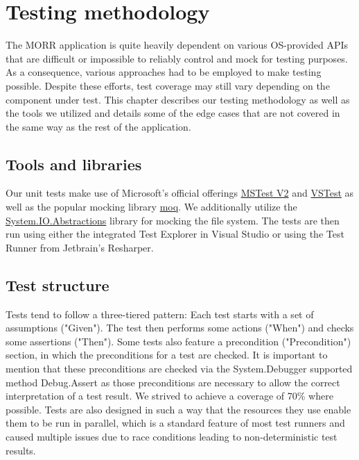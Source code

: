 \chapter{Testing methodology}

The MORR application is quite heavily dependent on various OS-provided APIs that are difficult or impossible to reliably control and mock for testing purposes. As a consequence, various approaches had to be employed to make testing possible. Despite these efforts, test coverage may still vary depending on the component under test. This chapter describes our testing methodology as well as the tools we utilized and details some of the edge cases that are not covered in the same way as the rest of the application.

\section{Tools and libraries}

Our unit tests make use of Microsoft's official offerings \href{https://github.com/microsoft/testfx}{MSTest V2} and \href{https://github.com/microsoft/vstest}{VSTest} as well as the popular mocking library \href{https://github.com/moq/moq4}{moq}. We additionally utilize the \href{https://github.com/System-IO-Abstractions/System.IO.Abstractions}{System.IO.Abstractions} library for mocking the file system. The tests are then run using either the integrated Test Explorer in Visual Studio or using the Test Runner from Jetbrain's Resharper.

\section{Test structure}

Tests tend to follow a three-tiered pattern: Each test starts with a set of assumptions ("Given"). The test then performs some actions ("When") and checks some assertions ("Then").
Some tests also feature a precondition ("Precondition") section, in which the preconditions for a test are checked. It is important to mention that these preconditions are checked via the System.Debugger supported method Debug.Assert as those preconditions are necessary to allow the correct interpretation of a test result.
We strived to achieve a coverage of 70\% where possible.
Tests are also designed in such a way that the resources they use enable them to be run in parallel, which is a standard feature of most test runners and caused multiple issues due to race conditions leading to non-deterministic test results.

